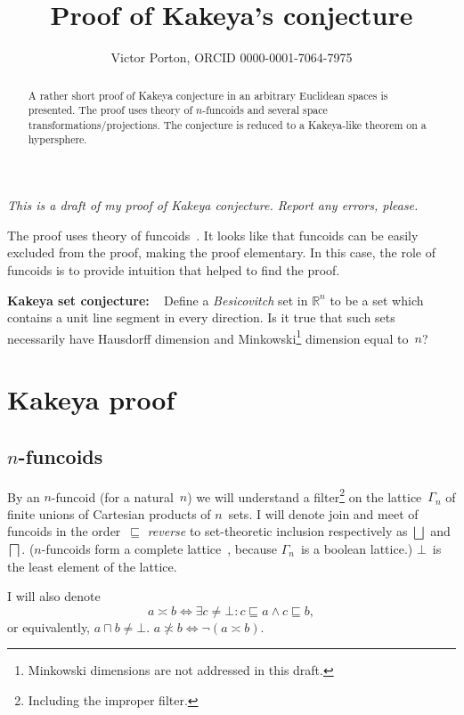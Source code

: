 \documentclass[oneside,draft]{amsart}
\title{Proof of Kakeya's conjecture}
\author{Victor Porton, ORCID 0000-0001-7064-7975}
\newcommand{\intrs}{\not\asymp}
\newcommand{\nintrs}{\asymp}
\begin{document}
\begin{abstract}
A rather short proof of Kakeya conjecture in an arbitrary Euclidean spaces is presented. The proof uses theory of $n$-fun\-co\-ids and several space transformations/projections. The conjecture is reduced to a Ka\-ke\-ya-li\-ke theorem on a hypersphere.
\end{abstract}

\maketitle  

\emph{This is a draft of my proof of Kakeya conjecture. Report any errors, please.}

The proof uses theory of funcoids~\cite{volume-1}. It looks like that funcoids can be easily excluded from the proof, making the proof elementary. In this case, the role of funcoids is to provide intuition that helped to find the proof.

\textbf{Kakeya set conjecture:} \cite{kakeya-long}~\cite{tao-blog-kakeya} Define a \emph{Besicovitch} set in $\mathbb{R}^n$ to be a set which contains a unit line segment in every direction. Is it true that such sets necessarily have Hausdorff dimension and Minkowski\footnote{Minkowski dimensions are not addressed in this draft.} dimension equal to~$n$?

\section{Kakeya proof}

\subsection{$n$-fun\-co\-ids}

By an $n$-fun\-co\-id (for a natural~$n$) we will understand a filter\footnote{Including the improper filter.} on the lattice~$\Gamma_n$ of finite unions of Cartesian products of $n$~sets. I will denote join and meet of funcoids in the order~$\sqsubseteq$ \emph{reverse} to set-the\-o\-re\-tic inclusion respectively as $\bigsqcup$ and $\bigsqcap$. ($n$-fun\-co\-ids form a complete lattice~\cite{volume-1}, because $\Gamma_n$~is a boolean lattice.) $\bot$~is the least element of the lattice.

I will also denote \[ a\nintrs b \Leftrightarrow \exists c\ne\bot: c\sqsubseteq a\land c\sqsubseteq b, \] or equivalently, $a\sqcap b\ne\bot$.
$a\intrs b\Leftrightarrow\lnot(a\nintrs b)$.
\end{document}

